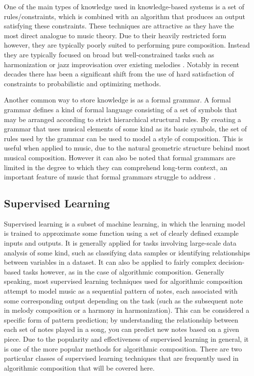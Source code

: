 \documentclass[ author={Stephen Livermore-Tozer},
				supervisor={Dr. Peter Flach},
				degree={MEng},
				title={Algorithmic Co-composition Using Machine Learning},
				subtitle={},
				type={research},
				year={2016} ]{dissertation}
\begin{document}
	One of the main types of knowledge used in knowledge-based systems is a set of rules/constraints, which is combined with an algorithm that produces an output satisfying these constraints. These techniques are attractive as they have the most direct analogue to music theory. Due to their heavily restricted form however, they are typically poorly suited to performing pure composition. Instead they are typically focused on broad but well-constrained tasks such as harmonization \cite{thomas1985vivace} or jazz improvisation over existing melodies \cite{horowitz1995representing}. Notably in recent decades there has been a significant shift from the use of hard satisfaction of constraints to probabilistic and optimizing methods.
	
	Another common way to store knowledge is as a formal grammar. A formal grammar defines a kind of formal language consisting of a set of symbols that may be arranged according to strict hierarchical structural rules. By creating a grammar that uses musical elements of some kind as its basic symbols, the set of rules used by the grammar can be used to model a style of composition. This is useful when applied to music, due to the natural geometric structure behind most musical composition. However it can also be noted that formal grammars are limited in the degree to which they can comprehend long-term context, an important feature of music that formal grammars struggle to address \cite{moorer1972music}.	 
	
	\subsection{Supervised Learning}
	\label{sec:supervised-learning}
	
	Supervised learning is a subset of machine learning, in which the learning model is trained to approximate some function using a set of clearly defined example inputs and outputs. It is generally applied for tasks involving large-scale data analysis of some kind, such as classifying data samples or identifying relationships between variables in a dataset. It can also be applied to fairly complex decision-based tasks however, as in the case of algorithmic composition. Generally speaking, most supervised learning techniques used for algorithmic composition attempt to model music as a sequential pattern of notes, each associated with some corresponding output depending on the task (such as the subsequent note in melody composition or a harmony in harmonization). This can be considered a specific form of pattern prediction; by understanding the relationship between each set of notes played in a song, you can predict new notes based on a given piece. Due to the popularity and effectiveness of supervised learning in general, it is one of the more popular methods for algorithmic composition. There are two particular classes of supervised learning techniques that are frequently used in algorithmic composition that will be covered here.
	
\end{document}
